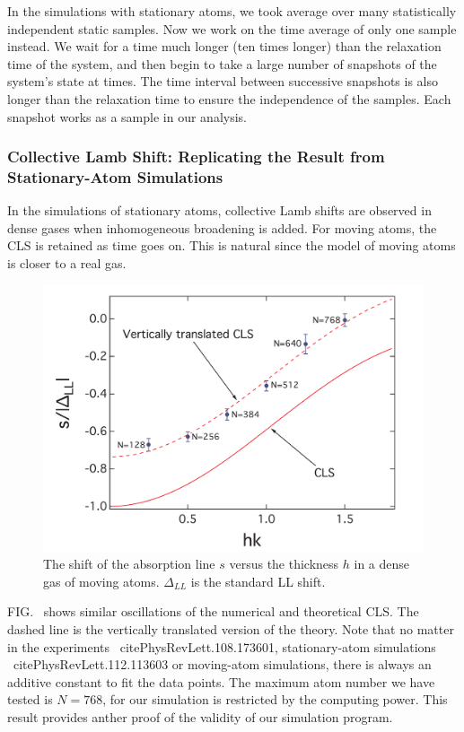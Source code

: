 In the simulations with stationary atoms, we took average over many statistically independent static samples. Now we work on the time average of only one sample instead.  We wait for a time much longer (ten times longer) than the relaxation time of the system, and then begin to take a large number of snapshots of the system's state at times. The time interval between successive snapshots is also longer than the relaxation time to ensure the independence of the samples. Each snapshot works as a sample in our analysis. 


\subsubsection{Collective Lamb Shift: Replicating the Result from Stationary-Atom Simulations}
 
In the simulations of stationary atoms, collective Lamb shifts are observed in dense gases when inhomogeneous broadening is added. For moving atoms,  the CLS is retained as time goes on. This is natural since the model of moving atoms is closer to a real gas.

\begin{figure}[h!]
\begin{center}
\includegraphics[width=\textwidth]{CLS.pdf}
\end{center}
\caption{The shift of the absorption line $s$ versus the thickness $h$ in a dense gas of moving atoms. $\Delta_{LL}$ is the standard LL shift.}
\label{CLS}
\end{figure}

FIG.~ shows similar oscillations of the numerical and theoretical CLS. The dashed line is the vertically translated version of the theory. Note that no matter in the experiments ~cite{PhysRevLett.108.173601}, stationary-atom simulations ~cite{PhysRevLett.112.113603} or moving-atom simulations, there is always an additive constant to fit the data points.  The maximum atom number we have tested is $N=768$, for our simulation is restricted by the computing power. This result provides anther proof of the validity of our simulation program.


